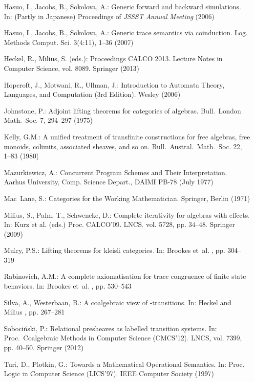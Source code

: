 \documentclass[oribibl,envcountsame,envcountsect,runningheads]{llncs}
\renewcommand{\>}{\rangle}
\begin{document}
\begin{thebibliography}{10}
Hasuo, I., Jacobs, B., Sokolova, A.: Generic forward and backward simulations.
  In: (Partly in Japanese) Proceedings of {\em JSSST Annual Meeting} (2006)

Hasuo, I., Jacobs, B., Sokolova, A.: Generic trace semantics via coinduction.
  Log. Methods Comput. Sci.  3(4:11),  1--36 (2007)

Heckel, R., Milius, S. (eds.): Proceedings CALCO 2013. Lecture Notes in Computer Science, vol. 8089. Springer (2013)

Hopcroft, J., Motwani, R., Ullman, J.: Introduction to Automata Theory,
  Languages, and Computation (3rd Edition). Wesley (2006)

Johnstone, P.: Adjoint lifting theorems for categories of algebras.
  Bull.~London Math.~Soc.  7,  294--297 (1975)

Kelly, G.M.: A unified treatment of transfinite constructions for free
  algebras, free monoids, colimits, associated sheaves, and so on.
  Bull.~Austral.~Math.~Soc.  22,  1--83 (1980)

Mazurkiewicz, A.: Concurrent Program Schemes and Their Interpretation. Aarhus
  University, Comp. Science Depart., DAIMI PB-78 (July 1977)

\mbox{Mac Lane}, S.: Categories for the Working Mathematician. Springer, Berlin
  (1971)

Milius, S., Palm, T., Schwencke, D.: Complete iterativity for algebras with
  effects. In: Kurz et al. (eds.) Proc. CALCO'09. LNCS,
  vol. 5728, pp. 34--48. Springer (2009)

Mulry, P.S.: Lifting theorems for kleisli categories. In: Brookes et~al.
  \cite{DBLP:conf/mfps/1993}, pp. 304--319

Rabinovich, A.M.: A complete axiomatisation for trace congruence of finite
  state behaviors. In: Brookes et~al.  \cite{DBLP:conf/mfps/1993}, pp. 530--543

Silva, A., Westerbaan, B.: A coalgebraic view of -transitions. In: Heckel and
  Milius  \cite{DBLP:conf/calco/2013}, pp. 267--281

Soboci\'{n}ski, P.: Relational presheaves as labelled transition systems. In:
Proc.~Coalgebraic Methods in Computer Science ({CMCS'12}). LNCS, vol. 7399, pp.
  40--50. Springer (2012)

Turi, D., Plotkin, G.: {Towards a Mathematical Operational Semantics}. In:
  {Proc. Logic in Computer Science (LICS'97)}. IEEE Computer Society ({1997})

\end{thebibliography}
\end{document}
